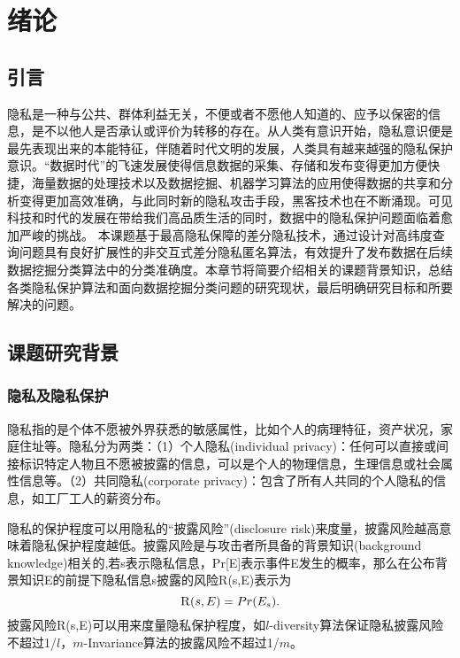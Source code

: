 
\chapter{绪论}
\label{chap:introduction}

\section{引言}
\label{sec:objective}
隐私是一种与公共、群体利益无关，不便或者不愿他人知道的、应予以保密的信息，是不以他人是否承认或评价为转移的存在。从人类有意识开始，隐私意识便是最先表现出来的本能特征，伴随着时代文明的发展，人类具有越来越强的隐私保护意识。“数据时代”的飞速发展使得信息数据的采集、存储和发布变得更加方便快捷，海量数据的处理技术以及数据挖掘、机器学习算法的应用使得数据的共享和分析变得更加高效准确，与此同时新的隐私攻击手段，黑客技术也在不断涌现。可见科技和时代的发展在带给我们高品质生活的同时，数据中的隐私保护问题面临着愈加严峻的挑战。
本课题基于最高隐私保障的差分隐私技术，通过设计对高纬度查询问题具有良好扩展性的非交互式差分隐私匿名算法，有效提升了发布数据在后续数据挖掘分类算法中的分类准确度。本章节将简要介绍相关的课题背景知识，总结各类隐私保护算法和面向数据挖掘分类问题的研究现状，最后明确研究目标和所要解决的问题。


\section{课题研究背景}

\subsection{隐私及隐私保护}  %

隐私指的是个体不愿被外界获悉的敏感属性，比如个人的病理特征，资产状况，家庭住址等。隐私分为两类\cite{Defining Privacy for Data}：（1）个人隐私(individual privacy)：任何可以直接或间接标识特定人物且不愿被披露的信息，可以是个人的物理信息，生理信息或社会属性信息等。（2）共同隐私(corporate privacy)：包含了所有人共同的个人隐私的信息，如工厂工人的薪资分布。

隐私的保护程度可以用隐私的“披露风险”(disclosure risk)\cite{l-diversity}来度量，披露风险越高意味着隐私保护程度越低。披露风险是与攻击者所具备的背景知识(background knowledge)相关的\cite{面向数据库应用的隐私保护研究综述},若s表示隐私信息，Pr[E]表示事件E发生的概率，那么在公布背景知识E的前提下隐私信息s披露的风险\textsc{R}(s,E)表示为
\[
	\textsc{R}(s,E) = Pr(E_{s}).
\]
披露风险\textsc{R}(s,E)可以用来度量隐私保护程度，如$l$-diversity算法\cite{l-diversity}保证隐私披露风险不超过1/$l$，$m$-Invariance算法\cite{m-Invariance}的披露风险不超过1/$m$。

